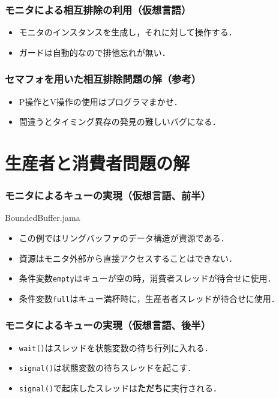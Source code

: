 \documentclass[unicode]{beamer}                   %
\begin{document}
\begin{frame}
  \frametitle{モニタによる相互排除の利用（仮想言語）}

  \begin{itemize}
  \item モニタのインスタンスを生成し，それに対して操作する．
  \item ガードは自動的なので排他忘れが無い．
  \end{itemize}
\end{frame}

\begin{frame}
  \frametitle{セマフォを用いた相互排除問題の解（参考）}

  \begin{itemize}
  \item P操作とV操作の使用はプログラマまかせ．
  \item 間違うとタイミング異存の発見の難しいバグになる．
  \end{itemize}
\end{frame}

\section{生産者と消費者問題の解}
\begin{frame}
  \frametitle{モニタによるキューの実現（仮想言語、前半）}
      {BoundedBuffer.jama}

  \begin{itemize}
  \item この例ではリングバッファのデータ構造が資源である．
  \item 資源はモニタ外部から直接アクセスすることはできない．
  \item 条件変数{\tt empty}はキューが空の時，消費者スレッドが待合せに使用．
  \item 条件変数{\tt full}はキュー満杯時に，生産者者スレッドが待合せに使用．
  \end{itemize}
\end{frame}

\begin{frame}
  \frametitle{モニタによるキューの実現（仮想言語、後半）}

  \begin{itemize}
  \item {\tt wait()}はスレッドを状態変数の待ち行列に入れる．
  \item {\tt signal()}は状態変数の待ちスレッドを起こす．
  \item {\tt signal()}で起床したスレッドは{\bf ただちに}実行される．
  \end{itemize}
\end{frame}
\end{document}
